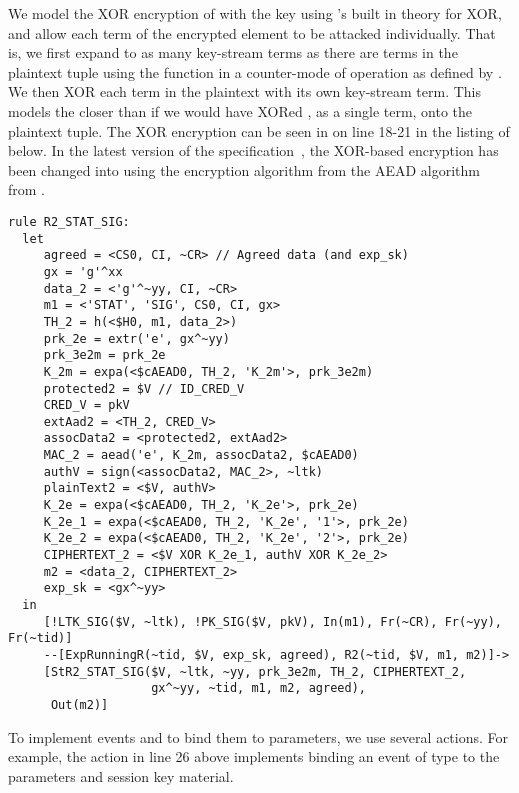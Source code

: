 %
We model the XOR encryption of  with the key  using
\mTamarin{}'s built in theory for XOR, and allow each term of the encrypted
element to be attacked individually.
%
That is, we first expand  to as many key-stream terms as there are
terms in the plaintext tuple using the \mHkdfExpand{} function in a counter-mode
of operation as defined by \mEdhoc{}.
%
We then XOR each term in the plaintext with its own key-stream term.
%
This models the \mSpec{} closer than if we would have XORed , as a
single term, onto the plaintext tuple.
%
The XOR encryption can be seen in on line 18-21 in the listing of
 below.
%
In the latest version of the \mEdhoc{}
specification~\cite{latest-ietf-lake-edhoc-03}, the XOR-based encryption
has been changed into using the encryption algorithm from the AEAD algorithm
from \mSuites{}.
%
\begin{lstlisting}
rule R2_STAT_SIG:
  let
     agreed = <CS0, CI, ~CR> // Agreed data (and exp_sk)
     gx = 'g'^xx
     data_2 = <'g'^~yy, CI, ~CR>
     m1 = <'STAT', 'SIG', CS0, CI, gx>
     TH_2 = h(<$H0, m1, data_2>)
     prk_2e = extr('e', gx^~yy)
     prk_3e2m = prk_2e
     K_2m = expa(<$cAEAD0, TH_2, 'K_2m'>, prk_3e2m)
     protected2 = $V // ID_CRED_V
     CRED_V = pkV
     extAad2 = <TH_2, CRED_V>
     assocData2 = <protected2, extAad2>
     MAC_2 = aead('e', K_2m, assocData2, $cAEAD0)
     authV = sign(<assocData2, MAC_2>, ~ltk)
     plainText2 = <$V, authV>
     K_2e = expa(<$cAEAD0, TH_2, 'K_2e'>, prk_2e)
     K_2e_1 = expa(<$cAEAD0, TH_2, 'K_2e', '1'>, prk_2e)
     K_2e_2 = expa(<$cAEAD0, TH_2, 'K_2e', '2'>, prk_2e)
     CIPHERTEXT_2 = <$V XOR K_2e_1, authV XOR K_2e_2>
     m2 = <data_2, CIPHERTEXT_2>
     exp_sk = <gx^~yy>
  in
     [!LTK_SIG($V, ~ltk), !PK_SIG($V, pkV), In(m1), Fr(~CR), Fr(~yy), Fr(~tid)]
     --[ExpRunningR(~tid, $V, exp_sk, agreed), R2(~tid, $V, m1, m2)]->
     [StR2_STAT_SIG($V, ~ltk, ~yy, prk_3e2m, TH_2, CIPHERTEXT_2,
                    gx^~yy, ~tid, m1, m2, agreed),
      Out(m2)]
\end{lstlisting}
%

To implement events and
to bind them to parameters, we use several \mTamarin{} actions.
%
For example, the action  in line 26
above implements binding an event of type \mRStart{} to the parameters and session key
material.%
%


